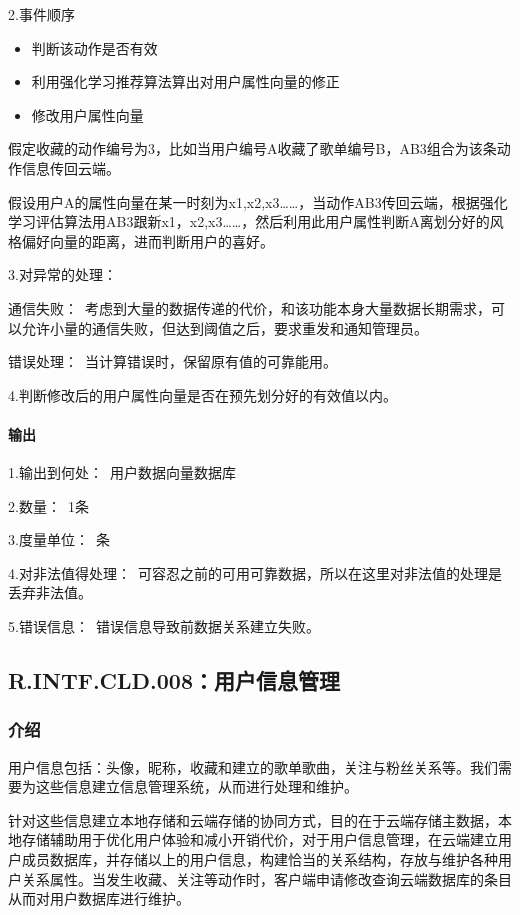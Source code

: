 2.事件顺序
\begin{itemize}
	
	
	\item 判断该动作是否有效
	\item 利用强化学习推荐算法算出对用户属性向量的修正
	\item 修改用户属性向量
\end{itemize}

假定收藏的动作编号为3，比如当用户编号A收藏了歌单编号B，AB3组合为该条动作信息传回云端。    

假设用户A的属性向量在某一时刻为{x1,x2,x3……}，当动作AB3传回云端，根据强化学习评估算法用AB3跟新x1，x2,x3……，然后利用此用户属性判断A离划分好的风格偏好向量的距离，进而判断用户的喜好。

3.对异常的处理：

通信失败：\ 考虑到大量的数据传递的代价，和该功能本身大量数据长期需求，可以允许小量的通信失败，但达到阈值之后，要求重发和通知管理员。

错误处理：\ 当计算错误时，保留原有值的可靠能用。

4.判断修改后的用户属性向量是否在预先划分好的有效值以内。

\paragraph{输出}
1.输出到何处：\ 用户数据向量数据库

2.数量：\ 1条

3.度量单位：\ 条

4.对非法值得处理：\  可容忍之前的可用可靠数据，所以在这里对非法值的处理是丢弃非法值。

5.错误信息：\ 错误信息导致前数据关系建立失败。



\subsection{R.INTF.CLD.008：用户信息管理}
\subsubsection{介绍}

用户信息包括：头像，昵称，收藏和建立的歌单歌曲，关注与粉丝关系等。我们需要为这些信息建立信息管理系统，从而进行处理和维护。

针对这些信息建立本地存储和云端存储的协同方式，目的在于云端存储主数据，本地存储辅助用于优化用户体验和减小开销代价，对于用户信息管理，在云端建立用户成员数据库，并存储以上的用户信息，构建恰当的关系结构，存放与维护各种用户关系属性。当发生收藏、关注等动作时，客户端申请修改查询云端数据库的条目从而对用户数据库进行维护。


